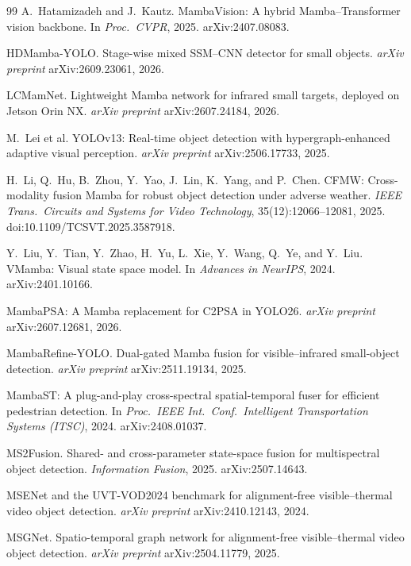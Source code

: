 \begin{thebibliography}{99}
A.~Hatamizadeh and J.~Kautz.
MambaVision: A hybrid Mamba--Transformer vision backbone.
In \textit{Proc.\ CVPR}, 2025. arXiv:2407.08083.

HDMamba-YOLO. Stage-wise mixed SSM--CNN detector for small objects.
\textit{arXiv preprint} arXiv:2609.23061, 2026.

LCMamNet. Lightweight Mamba network for infrared small targets, deployed on
Jetson Orin NX. \textit{arXiv preprint} arXiv:2607.24184, 2026.

M.~Lei et al.
YOLOv13: Real-time object detection with hypergraph-enhanced adaptive visual
perception. \textit{arXiv preprint} arXiv:2506.17733, 2025.

H.~Li, Q.~Hu, B.~Zhou, Y.~Yao, J.~Lin, K.~Yang, and P.~Chen.
CFMW: Cross-modality fusion Mamba for robust object detection under adverse
weather. \textit{IEEE Trans.\ Circuits and Systems for Video Technology},
35(12):12066--12081, 2025. doi:10.1109/TCSVT.2025.3587918.

Y.~Liu, Y.~Tian, Y.~Zhao, H.~Yu, L.~Xie, Y.~Wang, Q.~Ye, and Y.~Liu.
VMamba: Visual state space model.
In \textit{Advances in NeurIPS}, 2024. arXiv:2401.10166.

MambaPSA: A Mamba replacement for C2PSA in YOLO26.
\textit{arXiv preprint} arXiv:2607.12681, 2026.

MambaRefine-YOLO. Dual-gated Mamba fusion for visible--infrared small-object
detection. \textit{arXiv preprint} arXiv:2511.19134, 2025.

MambaST: A plug-and-play cross-spectral spatial-temporal fuser for efficient
pedestrian detection. In \textit{Proc.\ IEEE Int.\ Conf.\ Intelligent
Transportation Systems (ITSC)}, 2024. arXiv:2408.01037.

MS2Fusion. Shared- and cross-parameter state-space fusion for multispectral
object detection. \textit{Information Fusion}, 2025. arXiv:2507.14643.

MSENet and the UVT-VOD2024 benchmark for alignment-free visible--thermal video
object detection. \textit{arXiv preprint} arXiv:2410.12143, 2024.

MSGNet. Spatio-temporal graph network for alignment-free visible--thermal video
object detection. \textit{arXiv preprint} arXiv:2504.11779, 2025.


\end{thebibliography}
